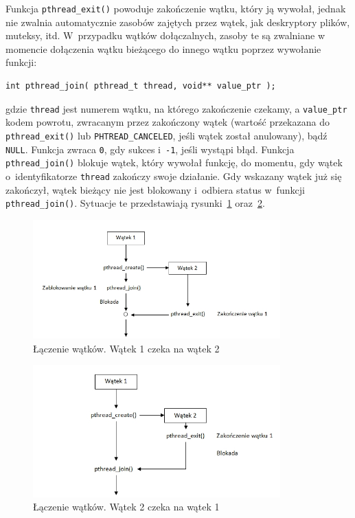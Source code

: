 Funkcja \lstinline[style=MyCStyle]{pthread_exit()} powoduje zakończenie wątku, który ją wywołał, jednak nie zwalnia automatycznie zasobów zajętych przez wątek, jak deskryptory plików, muteksy, itd. W~przypadku wątków dołączalnych, zasoby te są zwalniane w momencie dołączenia wątku bieżącego do innego wątku poprzez wywołanie funkcji:

\begin{lstlisting}[style=MyCStyle]
int pthread_join( pthread_t thread, void** value_ptr );
\end{lstlisting}

gdzie \lstinline[style=MyCStyle]{thread} jest numerem wątku, na którego zakończenie czekamy, a \lstinline[style=MyCStyle]{value_ptr} kodem powrotu, zwracanym przez zakończony wątek (wartość przekazana do \lstinline[style=MyCStyle]{pthread_exit()} lub \lstinline[style=MyCStyle]{PHTREAD_CANCELED}, jeśli wątek został anulowany), bądź \lstinline[style=MyCStyle]{NULL}. Funkcja zwraca \lstinline[style=MyCStyle]{0}, gdy sukces i~\lstinline[style=MyCStyle]{-1}, jeśli wystąpi błąd. Funkcja \lstinline[style=MyCStyle]{pthread_join()} blokuje wątek, który wywołał funkcję, do momentu, gdy wątek o~identyfikatorze \lstinline[style=MyCStyle]{thread} zakończy swoje działanie. Gdy wskazany wątek już się zakończył, wątek bieżący nie jest blokowany i~odbiera status w~funkcji \lstinline[style=MyCStyle]{pthread_join()}. Sytuacje te przedstawiają rysunki~\ref{fig:laczenie1} oraz~\ref{fig:laczenie2}.

\begin{figure}[!h]
\centering
\includegraphics[width=0.85\textwidth]{img/laczenie1}
\caption{Łączenie wątków. Wątek 1 czeka na wątek 2}
\label{fig:laczenie1}
\end{figure}
\begin{figure}[!h]
\centering
\includegraphics[width=0.85\textwidth]{img/laczenie2}
\caption{Łączenie wątków. Wątek 2 czeka na wątek 1}
\label{fig:laczenie2}
\end{figure}

